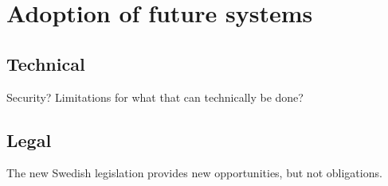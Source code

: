 \documentclass[14pt]{article}
\begin{document}
\newpage

\section{Adoption of future systems}
\label{sec:Future}


\subsection{Technical}
Security? Limitations for what that can technically be done?


\subsection{Legal}

The new Swedish legislation provides new opportunities, but not obligations. \cite{RiR19}
\end{document}
